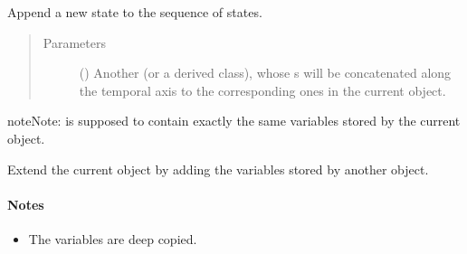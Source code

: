 \documentclass[letterpaper,10pt,english]{sphinxmanual}
\begin{document}
\begin{fulllineitems}
\begin{fulllineitems}
\begin{quote}
\begin{description}
\begin{itemize}
\end{itemize}

\end{description}\end{quote}

\end{fulllineitems}


\begin{fulllineitems}
\label{\detokenize{api:tasmania.storages.grid_data.GridData.append}}
Append a new state to the sequence of states.
\begin{quote}\begin{description}
\item[{Parameters}] \leavevmode
{} () \textendash{} Another {\hyperref[\detokenize{api:tasmania.storages.grid_data.GridData}]{}} (or a derived class), whose s
will be concatenated along the temporal axis to the corresponding ones in the current object.

\end{description}\end{quote}

\begin{sphinxadmonition}{note}{Note:}
 is supposed to contain exactly the same variables stored by the current object.
\end{sphinxadmonition}

\end{fulllineitems}


\begin{fulllineitems}
\label{\detokenize{api:tasmania.storages.grid_data.GridData.extend}}
Extend the current object by adding the variables stored by another object.
\paragraph{Notes}
\begin{itemize}
\item {} 
The variables are deep copied.


\end{itemize}
\end{fulllineitems}
\end{fulllineitems}
\end{document}
